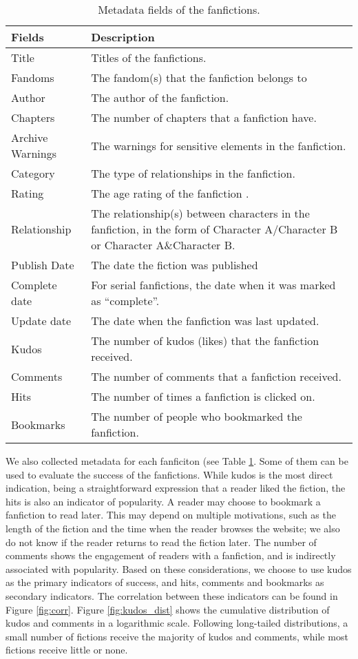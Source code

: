 \documentclass[a4paper]{article}
\begin{document}
\begin{table}
\centering
\begin{tabular}[width=0.8\textwidth]{p{3cm}p{10cm}}
\toprule
Fields & Description \\ 
   \hline			
Title & Titles of the fanfictions.  \\
Fandoms & The fandom(s) that the fanfiction belongs to \\
Author & The author of the fanfiction.  \\
Chapters & The number of chapters that a fanfiction have. \\
Archive Warnings & The warnings for sensitive elements in the fanfiction. \\
Category & The type of relationships in the fanfiction. \\
Rating & The age rating of the fanfiction . \\
Relationship & The relationship(s) between characters in the fanfiction, in the form of Character A/Character B
or Character A\&Character B. \\
Publish Date & The date the fiction was published \\
Complete date & For serial fanfictions, the date when it was marked as ``complete''.\\
Update date & The date when the fanfiction was last updated. \\
\hline
Kudos & The number of kudos (likes) that the fanfiction received. \\
Comments & The number of comments that a fanfiction received.\\
Hits & The number of times a fanfiction is clicked on. \\
Bookmarks & The number of people who bookmarked the fanfiction.\\

\bottomrule
\end{tabular}
\caption{Metadata fields of the fanfictions.}
\label{tab:metadata}
\end{table}%

We also collected metadata for each fanficiton (see Table \ref{tab:metadata}. Some of them can be used to evaluate the success of the fanfictions. While kudos is the most direct indication, being a straightforward expression that a reader liked the fiction, the hits is also an indicator of popularity. A reader may choose to bookmark a fanfiction to read later. This may depend on multiple motivations, such as the length of the fiction and the time when the reader browses the website; we also do not know if the reader returns to read the fiction later. The number of comments shows the engagement of readers with a fanfiction, and is indirectly associated with popularity. Based on these considerations, we choose to use kudos as the primary indicators of success, and hits, comments and bookmarks as secondary indicators. The correlation between these indicators can be found in Figure \ref{fig:corr}. Figure \ref{fig:kudos_dist} shows the cumulative distribution of kudos and comments in a logarithmic scale. Following long-tailed distributions, a small number of fictions receive the majority of kudos and comments, while most fictions receive little or none. 
\end{document}
